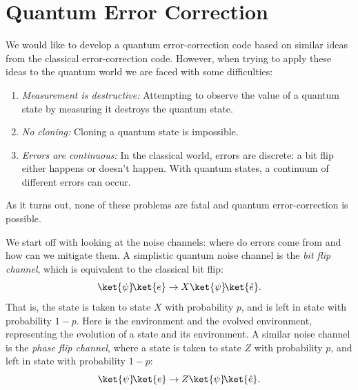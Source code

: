 \documentclass[11pt, notitlepage]{report}
\begin{document}
\section{Quantum Error Correction}
We would like to develop a quantum error-correction code based on similar ideas from the classical error-correction code. However, when trying to apply these ideas to the quantum world we are faced with some difficulties:
\begin{enumerate}
  \item \emph{Measurement is destructive:} Attempting to observe the value of a quantum state by measuring it destroys the quantum state.
  \item \emph{No cloning:} Cloning a quantum state is impossible.
  \item \emph{Errors are continuous:} In the classical world, errors are discrete: a bit flip either happens or doesn't happen. With quantum states, a continuum of different errors can occur.
\end{enumerate}
As it turns out, none of these problems are fatal and quantum error-correction is possible.

We start off with looking at the noise channels: where do errors come from and how can we mitigate them. A simplistic quantum noise channel is the \emph{bit flip channel}, which is equivalent to the classical bit flip:
\begin{equation}
  \ket{\psi}\!\ket{e} \rightarrow X\ket{\psi}\!\ket{\hat{e}}.
\end{equation}
That is, the state \ket{\psi} is taken to state $X$\ket{\psi} with probability $p$, and is left in state \ket{\psi} with probability $1 - p$. Here  is the environment and  the evolved environment, representing the evolution of a state and its environment. A similar noise channel is the \emph{phase flip channel}, where a state \ket{\psi} is taken to state $Z$\ket{\psi} with probability $p$, and left in state \ket{\psi} with probability $1 - p$:
\begin{equation}
  \ket{\psi}\!\ket{e} \rightarrow Z\ket{\psi}\!\ket{\hat{e}}.
\end{equation}
\end{document}
